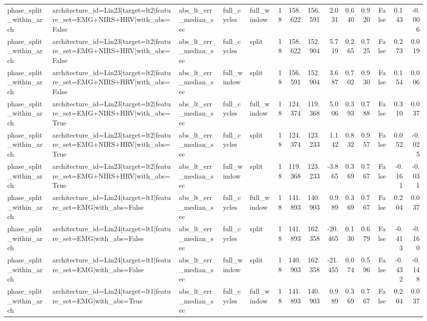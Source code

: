 \begin{table}
\begin{tabular}{lllllrrrrrrrrr}
phase_split_within_arch & architecture_id=Lin23|target=lt2|feature_set=EMG+NIRS+HRV|with_abs=False & abs_lt_err_median_sec & full_cycles & full_window & 18 & 158.622 & 156.591 & 2.031 & 0.640 & 0.920 & False & 0.143 & -0.006 \\
phase_split_within_arch & architecture_id=Lin23|target=lt2|feature_set=EMG+NIRS+HRV|with_abs=False & abs_lt_err_median_sec & full_cycles & split & 18 & 158.622 & 152.904 & 5.719 & 0.265 & 0.725 & False & 0.273 & 0.019 \\
phase_split_within_arch & architecture_id=Lin23|target=lt2|feature_set=EMG+NIRS+HRV|with_abs=False & abs_lt_err_median_sec & full_window & split & 18 & 156.591 & 152.904 & 3.687 & 0.702 & 0.930 & False & 0.154 & 0.006 \\
phase_split_within_arch & architecture_id=Lin23|target=lt2|feature_set=EMG+NIRS+HRV|with_abs=True & abs_lt_err_median_sec & full_cycles & full_window & 18 & 124.374 & 119.368 & 5.006 & 0.393 & 0.788 & False & 0.310 & 0.037 \\
phase_split_within_arch & architecture_id=Lin23|target=lt2|feature_set=EMG+NIRS+HRV|with_abs=True & abs_lt_err_median_sec & full_cycles & split & 18 & 124.374 & 123.233 & 1.142 & 0.832 & 0.957 & False & 0.052 & -0.025 \\
phase_split_within_arch & architecture_id=Lin23|target=lt2|feature_set=EMG+NIRS+HRV|with_abs=True & abs_lt_err_median_sec & full_window & split & 18 & 119.368 & 123.233 & -3.865 & 0.369 & 0.767 & False & -0.161 & -0.031 \\
phase_split_within_arch & architecture_id=Lin24|target=lt1|feature_set=EMG|with_abs=False & abs_lt_err_median_sec & full_cycles & full_window & 18 & 141.893 & 140.903 & 0.989 & 0.369 & 0.767 & False & 0.204 & 0.037 \\
phase_split_within_arch & architecture_id=Lin24|target=lt1|feature_set=EMG|with_abs=False & abs_lt_err_median_sec & full_cycles & split & 18 & 141.893 & 162.358 & -20.465 & 0.130 & 0.679 & False & -0.413 & -0.160 \\
phase_split_within_arch & architecture_id=Lin24|target=lt1|feature_set=EMG|with_abs=False & abs_lt_err_median_sec & full_window & split & 18 & 140.903 & 162.358 & -21.455 & 0.074 & 0.596 & False & -0.432 & -0.148 \\
phase_split_within_arch & architecture_id=Lin24|target=lt1|feature_set=EMG|with_abs=True & abs_lt_err_median_sec & full_cycles & full_window & 18 & 141.893 & 140.903 & 0.989 & 0.369 & 0.767 & False & 0.204 & 0.037 \\

\end{tabular}
\end{table}
